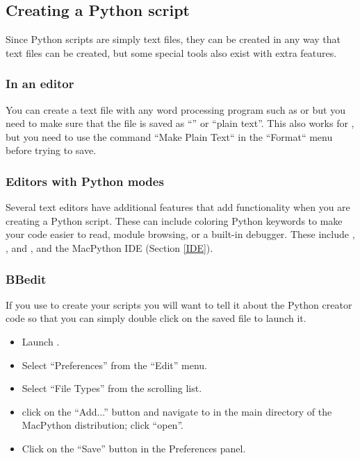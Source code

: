 \subsection{Creating a Python script}

Since Python scripts are simply text files, they can be created in any
way that text files can be created, but some special tools also exist
with extra features.


\subsubsection{In an editor}

You can create a text file with any word processing program such as
 or  but you need to make sure
that the file is saved as ``\ASCII'' or ``plain text''. This also
works for , but you need to use the command ``Make Plain Text``
in the ``Format`` menu before trying to save.


\subsubsection{Editors with Python modes}

Several text editors have additional features that add functionality
when you are creating a Python script.  These can include coloring
Python keywords to make your code easier to read, module browsing, or
a built-in debugger. These include , ,
and , and the MacPython IDE (Section \ref{IDE}).

 
\subsubsection{BBedit \label{scripting-with-BBedit}}

If you use  to create your scripts you will want to tell it about the Python creator code so that
you can simply double click on the saved file to launch it.
\begin{itemize}
  \item Launch .
  \item Select ``Preferences'' from the ``Edit'' menu.
  \item Select ``File Types'' from the scrolling list.
  \item click on the ``Add...'' button and navigate to
         in the main directory of the
        MacPython distribution; click ``open''.
  \item Click on the ``Save'' button in the Preferences panel.
\end{itemize}
 
